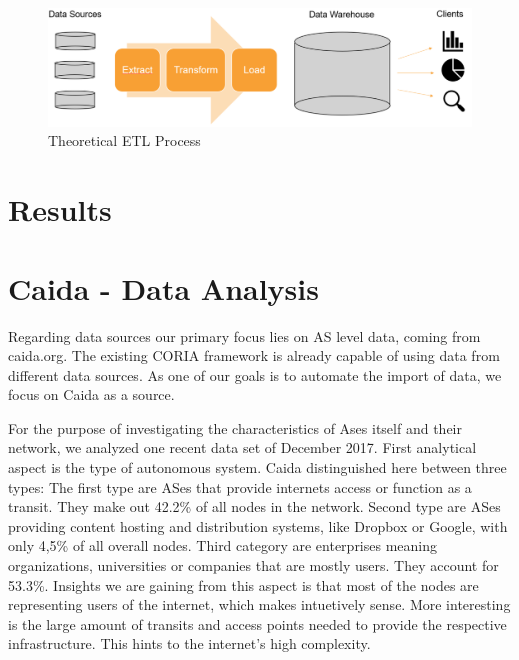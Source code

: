 \documentclass[conference]{IEEEtran}
\begin{document}
\begin{figure}[htbp]
\centerline{\includegraphics[scale=0.3]{Graphics/ETLTheory.PNG}}
\caption{Theoretical ETL Process}
\label{fig}
\end{figure}

\section{Results}

\section{Caida - Data Analysis}
Regarding data sources our primary focus lies on AS level data, coming from caida.org. The existing CORIA framework is already capable of using data from different data sources. As one of our goals is to automate the import of data, we focus on Caida as a source.

For the purpose of investigating the characteristics of Ases itself and their network, we analyzed one recent data set of December 2017.
First analytical aspect is the type of autonomous system. Caida distinguished here between three types: The first type are ASes that provide internets access or function as a transit. They make out 42.2\% of all nodes in the network. Second type are ASes providing content hosting and distribution systems, like Dropbox or Google, with only 4,5\% of all overall nodes. Third category are enterprises meaning organizations, universities or companies that are mostly users. They account for 53.3\%. Insights we are gaining from this aspect is that most of the nodes are representing users of the internet, which makes intuetively sense. More interesting is the large amount of transits and access points needed to provide the respective infrastructure. This hints to the internet's high complexity. 
\end{document}
